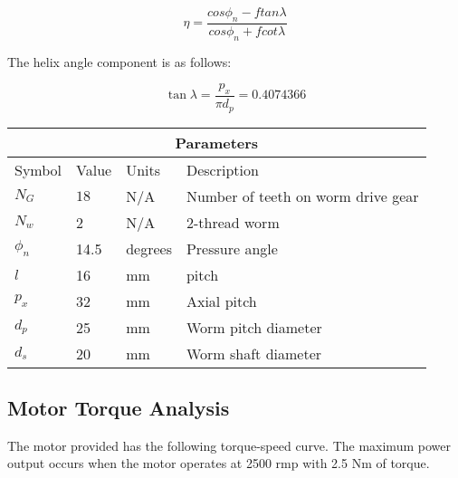 \documentclass[letterpaper,12pt]{article}
\begin{document}
	\begin{equation}
	\eta = \frac{cos\phi_n - ftan\lambda}{cos\phi_n+fcot\lambda}
	\end{equation}
	
The helix angle component is as follows:

	\begin{equation}
\tan \lambda =  \frac{p_x}{\pi d_p} = 0.4074366
	\end{equation}

\begin{center}
		\begin{tabular}{ |p{2cm}||p{3cm}|p{2cm}|p{7cm}|  }
			\hline
			\multicolumn{4}{|c|}{Parameters} \\
			\hline
			Symbol& Value & Units & Description\\
			\hline
			$N_G$ & $18$ & N/A & Number of teeth on worm drive gear\\
			$N_w$ & 2 & N/A   & 2-thread worm \\
			$\phi_n$ & 14.5 & degrees &  Pressure angle\\
			$l$ & 16 & mm & pitch\\
			$p_x$ & 32 & mm & Axial pitch\\
			$d_p$ & 25 & mm & Worm pitch diameter\\
			$d_s$ & 20 & mm & Worm shaft diameter\\
			\hline
		\end{tabular}
	\end{center}


\subsection{Motor Torque Analysis}
The motor provided has the following torque-speed curve. The maximum power output occurs when the motor operates at 2500 rmp with 2.5 Nm of torque. \\

\end{document}
